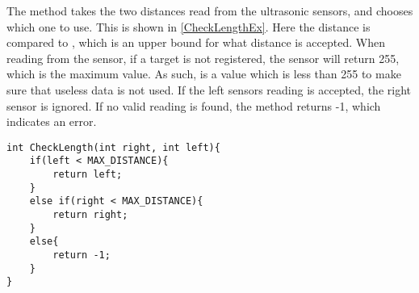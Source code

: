 The  method takes the two distances read from the ultrasonic
sensors, and chooses which one to use. This is shown in \autoref{CheckLengthEx}.
Here the distance is compared to , which is an upper bound
for what distance is accepted. When reading from the sensor, if a target is not
registered, the sensor will return 255, which is the maximum value. As such,
 is a value which is less than 255 to make sure that
useless data is not used. If the left sensors reading is accepted, the right
sensor is ignored. If no valid reading is found, the method returns -1, which
indicates an error.

\begin{minipage}[H]{\linewidth}
\begin{lstlisting}[caption = CheckLength method which chooses the best input distance., label = CheckLengthEx] 
int CheckLength(int right, int left){
    if(left < MAX_DISTANCE){
        return left;
    }
    else if(right < MAX_DISTANCE){
        return right;
    }
    else{
        return -1;
    }
}
\end{lstlisting}
\end{minipage}
